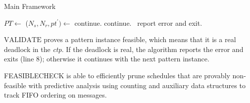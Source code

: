 \begin{algorithm}[t]
\caption{Main Framework}\label{algo:main}
\begin{algorithmic}[1]
\State  $\mathit{PT} \gets$ 
\State ($\mathit{N_s}, \mathit{N_r}, \mathit{pt^\prime})\gets$
\State continue.
\State continue.
\Else\ report error and exit.
\EndIf

\EndFor
\end{algorithmic}
\end{algorithm}


$\mathrm{VALIDATE}$ proves a pattern instance feasible, which means that it is a real deadlock in the \emph{ctp}. If the deadlock is real, the algorithm reports the error and exits (line 8); otherwise it continues with the next pattern instance.

\textrm{FEASIBLECHECK} is able to efficiently prune schedules that are provably non-feasible with predictive analysis using counting and  auxiliary data structures to track FIFO ordering on messages. 

